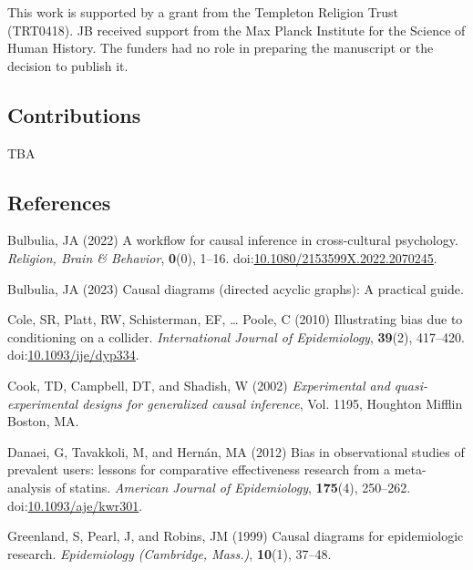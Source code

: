 \documentclass[
  singlecolumn]{article}
\newlength{\cslhangindent}
\newenvironment{CSLReferences}[2] %
 {\begin{list}{}{%
  \setlength{\itemindent}{0pt}
  \setlength{\leftmargin}{0pt}
  \setlength{\parsep}{0pt}
  \ifodd #1
   \setlength{\leftmargin}{\cslhangindent}
   \setlength{\itemindent}{-1\cslhangindent}
  \fi
  \setlength{\itemsep}{#2\baselineskip}}}
 {\end{list}}
\begin{document}
This work is supported by a grant from the Templeton Religion Trust
(TRT0418). JB received support from the Max Planck Institute for the
Science of Human History. The funders had no role in preparing the
manuscript or the decision to publish it.

\subsection{Contributions}\label{contributions}

TBA

\subsection{References}\label{references}

\label{refs}
\begin{CSLReferences}{1}{0}
Bulbulia, JA (2022) A workflow for causal inference in cross-cultural
psychology. \emph{Religion, Brain \& Behavior}, \textbf{0}(0), 1--16.
doi:\href{https://doi.org/10.1080/2153599X.2022.2070245}{10.1080/2153599X.2022.2070245}.

Bulbulia, JA (2023) Causal diagrams (directed acyclic graphs): A
practical guide.

Cole, SR, Platt, RW, Schisterman, EF, \ldots{} Poole, C (2010)
Illustrating bias due to conditioning on a collider. \emph{International
Journal of Epidemiology}, \textbf{39}(2), 417--420.
doi:\href{https://doi.org/10.1093/ije/dyp334}{10.1093/ije/dyp334}.

Cook, TD, Campbell, DT, and Shadish, W (2002) \emph{Experimental and
quasi-experimental designs for generalized causal inference}, Vol. 1195,
Houghton Mifflin Boston, MA.

Danaei, G, Tavakkoli, M, and Hernán, MA (2012) Bias in observational
studies of prevalent users: lessons for comparative effectiveness
research from a meta-analysis of statins. \emph{American Journal of
Epidemiology}, \textbf{175}(4), 250--262.
doi:\href{https://doi.org/10.1093/aje/kwr301}{10.1093/aje/kwr301}.

Greenland, S, Pearl, J, and Robins, JM (1999) Causal diagrams for
epidemiologic research. \emph{Epidemiology (Cambridge, Mass.)},
\textbf{10}(1), 37--48.


\end{CSLReferences}
\end{document}
